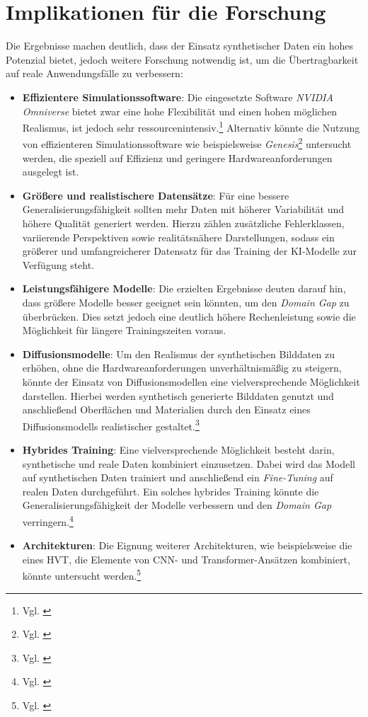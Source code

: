 \section{Implikationen für die Forschung}
Die Ergebnisse machen deutlich, dass der Einsatz synthetischer Daten ein hohes Potenzial bietet, jedoch weitere Forschung notwendig ist, um die Übertragbarkeit auf reale Anwendungsfälle zu verbessern:

\begin{itemize}
    \item \textbf{Effizientere Simulationssoftware}: Die eingesetzte Software \textit{NVIDIA Omniverse} bietet zwar eine hohe Flexibilität und einen hohen möglichen Realismus, ist jedoch sehr ressourcenintensiv.\footnote{Vgl. \cite{noauthor_isaac_nodate}} Alternativ könnte die Nutzung von effizienteren Simulationssoftware wie beispielsweise \textit{Genesis}\footnote{Vgl. \cite{noauthor_genesis-embodied-aigenesis_2025}} untersucht werden, die speziell auf Effizienz und geringere Hardwareanforderungen ausgelegt ist.
    \item \textbf{Größere und realistischere Datensätze}: Für eine bessere Generalisierungsfähigkeit sollten mehr Daten mit höherer Variabilität und höhere Qualität generiert werden. Hierzu zählen zusätzliche Fehlerklassen, variierende Perspektiven sowie realitätsnähere Darstellungen, sodass ein größerer und umfangreicherer Datensatz für das Training der \ac{KI}-Modelle zur Verfügung steht.
    \item \textbf{Leistungsfähigere Modelle}: Die erzielten Ergebnisse deuten darauf hin, dass größere Modelle besser geeignet sein könnten, um den \textit{Domain Gap} zu überbrücken. Dies setzt jedoch eine deutlich höhere Rechenleistung sowie die Möglichkeit für längere Trainingszeiten voraus.
    \item \textbf{Diffusionsmodelle}: Um den Realismus der synthetischen Bilddaten zu erhöhen, ohne die Hardwareanforderungen unverhältnismäßig zu steigern, könnte der Einsatz von Diffusionsmodellen eine vielversprechende Möglichkeit darstellen. Hierbei werden synthetisch generierte Bilddaten genutzt und anschließend Oberflächen und Materialien durch den Einsatz eines Diffusionsmodells realistischer gestaltet.\footnote{Vgl. \cite{hadadan_generative_2025}}
    \item \textbf{Hybrides Training}: Eine vielversprechende Möglichkeit besteht darin, synthetische und reale Daten kombiniert einzusetzen. Dabei wird das Modell auf synthetischen Daten trainiert und anschließend ein \textit{Fine-Tuning} auf realen Daten durchgeführt. Ein solches hybrides Training könnte die Generalisierungsfähigkeit der Modelle verbessern und den \textit{Domain Gap} verringern.\footnote{Vgl. \cite[17]{zaripov_creation_2025}}
    \item \textbf{Architekturen}: Die Eignung weiterer Architekturen, wie beispielsweise die eines \ac{HVT}, die Elemente von \ac{CNN}- und Transformer-Ansätzen kombiniert, könnte untersucht werden.\footnote{Vgl. \cite[S. 4 f.]{khan_survey_2023}}
\end{itemize}

